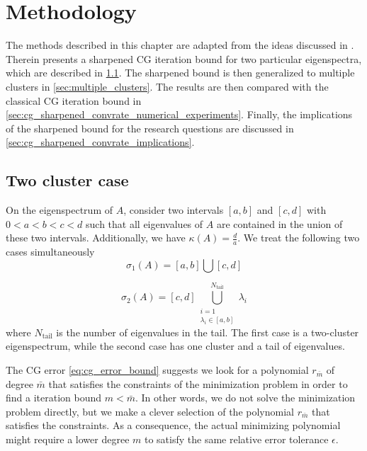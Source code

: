\chapter{Methodology}\label{ch:methods}
The methods described in this chapter are adapted from the ideas discussed in \cite[Section 4]{cg_sharpened_convrate_Axelsson1976}. Therein \citeauthor{cg_sharpened_convrate_Axelsson1976} presents a sharpened CG iteration bound for two particular eigenspectra, which are described in \cref{sec:cg_sharpened_convrate}. The sharpened bound is then generalized to multiple clusters in \cref{sec:multiple_clusters}. The results are then compared with the classical CG iteration bound in \cref{sec:cg_sharpened_convrate_numerical_experiments}. Finally, the implications of the sharpened bound for the research questions are discussed in \cref{sec:cg_sharpened_convrate_implications}.

\section{Two cluster case}\label{sec:cg_sharpened_convrate}
On the eigenspectrum of $A$, consider two intervals $[a, b]$ and $[c, d]$ with $0 < a < b < c < d$ such that all eigenvalues of $A$ are contained in the union of these two intervals. Additionally, we have $\kappa(A) = \frac{d}{a}$. We treat the following two cases simultaneously
\begin{equation}
    \sigma_1(A) = [a,b] \bigcup [c,d]
    \label{eq:two_clusters}
\end{equation}

\begin{equation}
    \sigma_2(A) = [c,d] \bigcup_{\substack{i=1 \\ \lambda_i \in [a,b]}}^{N_{\text{tail}}} \lambda_i
    \label{eq:one_cluster_with_tail}
\end{equation}
where $N_{\text{tail}}$ is the number of eigenvalues in the tail. The first case is a two-cluster eigenspectrum, while the second case has one cluster and a tail of eigenvalues.
 
The CG error \cref{eq:cg_error_bound} suggests we look for a polynomial $r_{\bar{m}}$ of degree $\bar{m}$ that satisfies the constraints of the minimization problem in order to find a iteration bound $m < \bar{m}$. In other words, we do not solve the minimization problem directly, but we make a clever selection of the polynomial $r_{\bar{m}}$ that satisfies the constraints. As a consequence, the actual minimizing polynomial might require a lower degree $m$ to satisfy the same relative error tolerance $\epsilon$.

